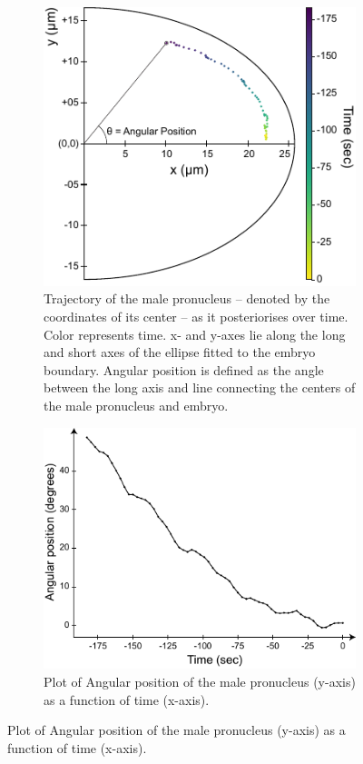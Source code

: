 \begin{figure}[h]
\centering

\begin{subfigure}[t]{0.45\textwidth}
    \centering
    \includegraphics[width=\textwidth]{ExpMethods/FigTrackNucleus/trajectory.pdf}
    \caption{Trajectory of the male pronucleus -- denoted by the coordinates of its center -- as it posteriorises over time. Color represents time. x- and y-axes lie along the long and short axes of the ellipse fitted to the embryo boundary. Angular position is defined as the angle between the long axis and line connecting the centers of the male pronucleus and embryo.} 
    \label{subfig:malePronucleusTrackingResults-trackPronucleus}
\end{subfigure}
\hfill
\begin{subfigure}[t]{0.45\textwidth}
    \centering
    \includegraphics[width=\textwidth]{ExpMethods/FigTrackNucleus/angularPosVsTime.pdf}
    \caption{Plot of Angular position of the male pronucleus (y-axis) as a function of time (x-axis).} 
    \label{subfig:malePronucleusTrackingResults-angularPosVsTime}
\end{subfigure}


\end{figure}
